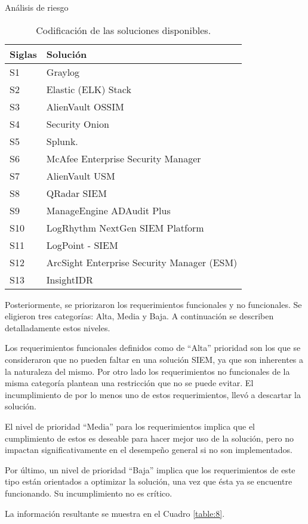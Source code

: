 \begin{section}{Análisis de riesgo}
\begin{table}[H]
\begin{tabular}{|m{6em}|m{20em}|}
            \hline 
                Siglas  & Solución \\ 
            \hline
                S1 & Graylog \\ 
            \hline
                S2  & Elastic (ELK) Stack \\ 
            \hline
                S3 & AlienVault OSSIM \\
            \hline
                S4 & Security Onion \\
            \hline
                S5 & Splunk. \\
            \hline
                S6 & McAfee Enterprise Security Manager \\
            \hline
                S7 & AlienVault USM \\
            \hline
                S8 & QRadar SIEM \\
            \hline
                S9 & ManageEngine ADAudit Plus \\
            \hline
                S10 & LogRhythm NextGen SIEM Platform \\
            \hline
                S11 & LogPoint - SIEM \\
            \hline
                S12 & ArcSight Enterprise Security Manager (ESM) \\
            \hline
                S13 & InsightIDR \\
            \hline %
        \end{tabular}
        \caption{Codificación de las soluciones disponibles.}
        \label{table:7}
    \end{table}
     \FloatBarrier
     
     Posteriormente, se priorizaron los requerimientos funcionales y no funcionales. Se eligieron tres categorías: Alta, Media y Baja. A continuación se describen detalladamente estos niveles.\par
     Los requerimientos funcionales definidos como de “Alta” prioridad son los que se consideraron que no pueden faltar en una solución SIEM, ya que son inherentes a la naturaleza del mismo. Por otro lado los requerimientos no funcionales de la misma categoría plantean una restricción que no se puede evitar. El incumplimiento de por lo menos uno de estos requerimientos, llevó a descartar la solución. \par
     El nivel de prioridad “Media” para los requerimientos implica  que el cumplimiento de estos es deseable para hacer mejor uso de la solución, pero no impactan significativamente en el desempeño general si no son implementados.\par
     Por último, un nivel de prioridad “Baja” implica que los requerimientos de este tipo están orientados a optimizar la solución, una vez que ésta ya se encuentre funcionando. Su incumplimiento no es crítico. \par 
     La información resultante se muestra en el Cuadro \ref{table:8}.
     \begin{table}[H]
        \centering
        \begin{tabular}{|m{3em}|m{28em}|m{4em}|}
        

\end{tabular}
\end{table}
\end{section}

